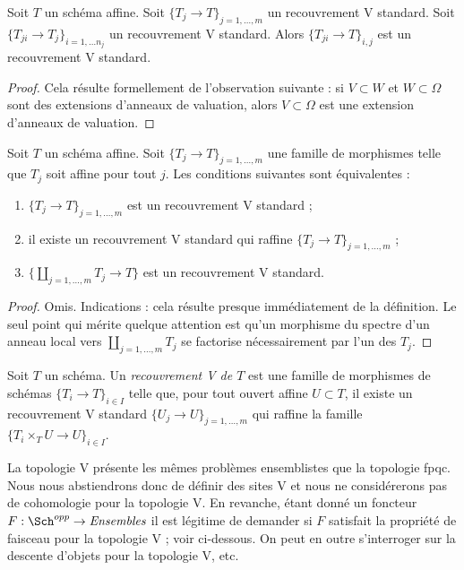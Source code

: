 \begin{lemma}
\label{lemma-composition-standard-V}
Soit $T$ un schéma affine. Soit $\{T_j \to T\}_{j = 1, \ldots, m}$
un recouvrement V standard. Soit $\{T_{ji} \to T_j\}_{i = 1, \ldots n_j}$
un recouvrement V standard. Alors $\{T_{ji} \to T\}_{i, j}$
est un recouvrement V standard.
\end{lemma}

\begin{proof}
Cela résulte formellement de l'observation suivante : si
$V \subset W$ et $W \subset \Omega$ sont des extensions
d'anneaux de valuation, alors $V \subset \Omega$ est une extension
d'anneaux de valuation.
\end{proof}

\begin{lemma}
\label{lemma-refine-standard-V}
Soit $T$ un schéma affine. Soit $\{T_j \to T\}_{j = 1, \ldots, m}$
une famille de morphismes telle que $T_j$ soit affine pour tout $j$.
Les conditions suivantes sont équivalentes :
\begin{enumerate}
\item $\{T_j \to T\}_{j = 1, \ldots, m}$ est un recouvrement V standard ;
\item il existe un recouvrement V standard qui raffine
$\{T_j \to T\}_{j = 1, \ldots, m}$ ;
\item $\{\coprod_{j = 1, \ldots, m} T_j \to T\}$ est un recouvrement
V standard.
\end{enumerate}
\end{lemma}

\begin{proof}
Omis. Indications : cela résulte presque immédiatement de la définition.
Le seul point qui mérite quelque attention est qu'un
morphisme du spectre d'un anneau local vers
$\coprod_{j = 1, \ldots, m} T_j$ se factorise nécessairement par l'un des $T_j$.
\end{proof}

\begin{definition}
\label{definition-V-covering}
Soit $T$ un schéma. Un {\it recouvrement V de $T$} est une famille
de morphismes de schémas $\{T_i \to T\}_{i \in I}$ telle que, pour tout
ouvert affine $U \subset T$, il existe un recouvrement V standard
$\{U_j \to U\}_{j = 1, \ldots, m}$ qui raffine la famille
$\{T_i \times_T U \to U\}_{i \in I}$.
\end{definition}

\noindent
La topologie V présente les mêmes problèmes ensemblistes que
la topologie fpqc. Nous nous abstiendrons donc de définir des sites V
et nous ne considérerons pas de cohomologie pour la topologie V.
En revanche, étant donné un foncteur
$F : \Sch^{opp} \to \textit{Ensembles}$
il est légitime de demander si $F$ satisfait la propriété de faisceau
pour la topologie V ; voir ci-dessous.
On peut en outre s'interroger sur la descente d'objets
pour la topologie V, etc.

